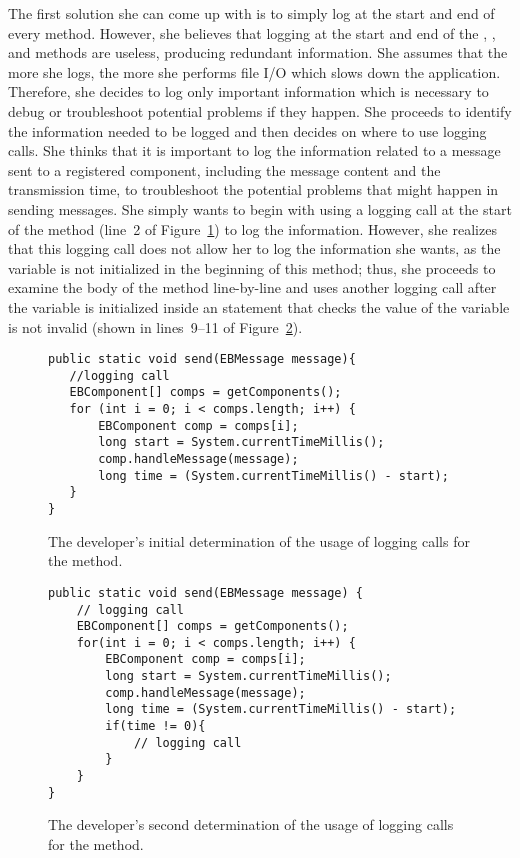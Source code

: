 The first solution she can come up with is to simply log at the start and end of every method. However, she believes that logging at the start and end of the , \-\-, and  methods are useless, producing redundant information. She assumes that the more she logs, the more she performs file I/O which slows down the application. Therefore, she decides to log only important information which is necessary to debug or troubleshoot potential problems if they happen. She proceeds to identify the information needed to be logged and then decides on where to use logging calls. She thinks that it is important to log the information related to a message sent to a registered component, including the message content and the transmission time, to troubleshoot the potential problems that might happen in sending messages. She simply wants to begin with using a logging call at the start of the  method (line~2 of Figure~\ref{ch2-ex-logged-m1}) to log the information. However, she realizes that this logging call does not allow her to log the information she wants, as the  variable is not initialized in the beginning of this method; thus, she proceeds to examine the body of the  method line-by-line and uses another logging call after the  variable is initialized inside an  statement that checks the value of the variable  is not invalid (shown in lines~9--11 of Figure~\ref{ch2-ex-logged-m2}).

\begin{figure}[p]
\def\baselinestretch{1}
\begin{lstlisting}
public static void send(EBMessage message){
   //logging call
   EBComponent[] comps = getComponents();
   for (int i = 0; i < comps.length; i++) {
       EBComponent comp = comps[i];
       long start = System.currentTimeMillis();
       comp.handleMessage(message);
       long time = (System.currentTimeMillis() - start);
   }
}
\end{lstlisting}
\caption{The developer's initial determination of the usage of logging calls for the  method.\label{ch2-ex-logged-m1}}
\end{figure}

\begin{figure}[p]
\def\baselinestretch{1}
\begin{lstlisting}
public static void send(EBMessage message) {
    // logging call
    EBComponent[] comps = getComponents();
    for(int i = 0; i < comps.length; i++) {
        EBComponent comp = comps[i];
        long start = System.currentTimeMillis();
        comp.handleMessage(message);
        long time = (System.currentTimeMillis() - start);
        if(time != 0){
            // logging call
        }
    }
}
\end{lstlisting}
\caption{The developer's second determination of the usage of logging calls for the  method.\label{ch2-ex-logged-m2}}
\end{figure}


